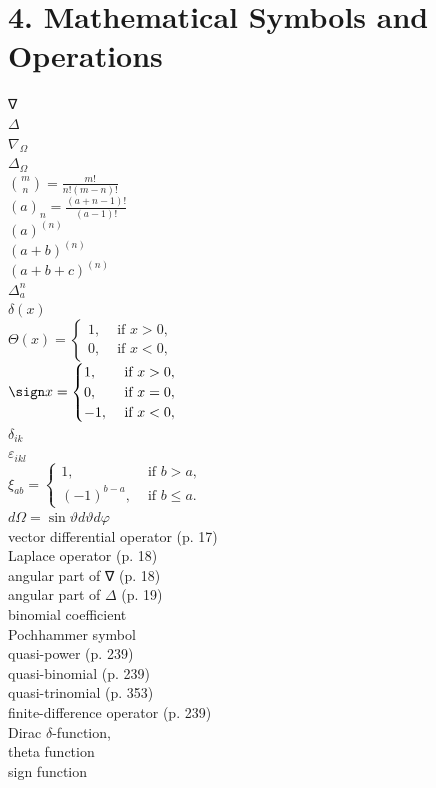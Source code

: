 \section*{4. Mathematical Symbols and Operations}
∇\\
$\Delta$\\
$\nabla_{\Omega}$\\
$\Delta_{\Omega}$\\
$\binom{m}{n}=\frac{m!}{n!(m-n)!}$\\
$(a)_{n}=\frac{(a+n-1)!}{(a-1)!}$\\
$(a)^{(n)}$\\
$(a+b)^{(n)}$\\
$(a+b+c)^{(n)}$\\
$\Delta_{a}^{n}$\\
$\delta(x)$\\
$\Theta(x)= \begin{cases}1, & \text { if } x>0, \\ 0, & \text { if } x<0,\end{cases}$\\
$\sign x= \begin{cases}1, & \text { if } x>0, \\ 0, & \text { if } x=0, \\ -1, & \text { if } x<0,\end{cases}$\\
$\delta_{i k}$\\
$\varepsilon_{i k l}$\\
$\xi_{a b}= \begin{cases}1, & \text { if } b>a, \\ (-1)^{b-a}, & \text { if } b \leq a .\end{cases}$\\
$d \Omega=\sin \vartheta d \vartheta d \varphi$\\
vector differential operator (p. 17)\\
Laplace operator (p. 18)\\
angular part of ∇ (p. 18)\\
angular part of $\Delta$ (p. 19)\\
binomial coefficient\\
Pochhammer symbol\\
quasi-power (p. 239)\\
quasi-binomial (p. 239)\\
quasi-trinomial (p. 353)\\
finite-difference operator (p. 239)\\
Dirac $\delta$-function,\\
theta function\\
sign function

